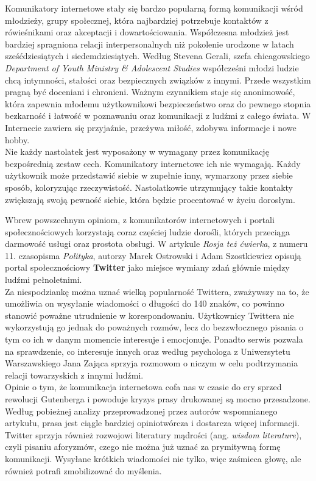 \documentclass[a4paper,12pt]{article}
\begin{document}
\par Komunikatory internetowe stały się bardzo popularną formą komunikacji wśród młodzieży, grupy społecznej, która najbardziej potrzebuje kontaktów z rówieśnikami oraz akceptacji i dowartościowania. Współczesna młodzież jest bardziej spragniona relacji interpersonalnych niż pokolenie urodzone w latach sześćdziesiątych i siedemdziesiątych.
Według Stevena Gerali, szefa chicagowskiego \emph{Department of Youth Ministry \& Adolescent Studies} współcześni młodzi ludzie chcą intymności, stałości oraz bezpiecznych związków z innymi. Przede wszystkim pragną być doceniani i chronieni. Ważnym czynnikiem staje się anonimowość, która zapewnia młodemu użytkownikowi bezpieczeństwo oraz do pewnego stopnia bezkarność i łatwość w poznawaniu oraz komunikacji z ludźmi z całego świata.
W Internecie zawiera się przyjaźnie, przeżywa miłość, zdobywa informacje i nowe hobby.\\
Nie każdy nastolatek jest wyposażony w wymagany przez komunikację bezpośrednią zestaw cech. Komunikatory internetowe ich nie wymagają. Każdy użytkownik może przedstawić siebie w zupełnie inny, wymarzony przez siebie sposób, koloryzując rzeczywistość. Nastolatkowie utrzymujący takie kontakty zwiększają swoją pewność siebie, która będzie procentować w życiu dorosłym.

\par Wbrew powszechnym opiniom, z komunikatorów internetowych i portali społecznościowych korzystają coraz częściej ludzie dorośli, których przeciąga darmowość usługi oraz prostota obsługi. W artykule \emph{Rosja też ćwierka}, z numeru 11. czasopisma \emph{Polityka}, autorzy Marek Ostrowski i Adam Szostkiewicz opisują portal społecznościowy \textbf{Twitter} jako miejsce wymiany zdań głównie między ludźmi pełnoletnimi.\\
Za niespodziankę można uznać wielką popularność Twittera, zważywszy na to, że umożliwia on wysyłanie wiadomości o długości do 140 znaków, co powinno stanowić poważne utrudnienie w korespondowaniu. Użytkownicy Twittera nie wykorzystują go jednak do poważnych rozmów, lecz do bezzwłocznego pisania o tym co ich w danym momencie interesuje i emocjonuje. Ponadto serwis pozwala na sprawdzenie, co interesuje innych oraz według psychologa z Uniwersytetu Warszawskiego Jana Zająca sprzyja rozmowom o niczym w celu podtrzymania relacji towarzyskich z innymi ludźmi.\\
Opinie o tym, że komunikacja internetowa cofa nas w czasie do ery sprzed rewolucji Gutenberga i powoduje kryzys prasy drukowanej są mocno przesadzone. Według pobieżnej analizy przeprowadzonej przez autorów wspomnianego artykułu, prasa jest ciągle bardziej opiniotwórcza i dostarcza więcej informacji.\\
Twitter sprzyja również rozwojowi literatury mądrości (ang. \textit{wisdom literature}), czyli pisaniu aforyzmów, czego nie można już uznać za prymitywną formę komunikacji. Wysyłane krótkich wiadomości nie tylko, więc zaśmieca głowę, ale również potrafi zmobilizować do myślenia.
\end{document}
